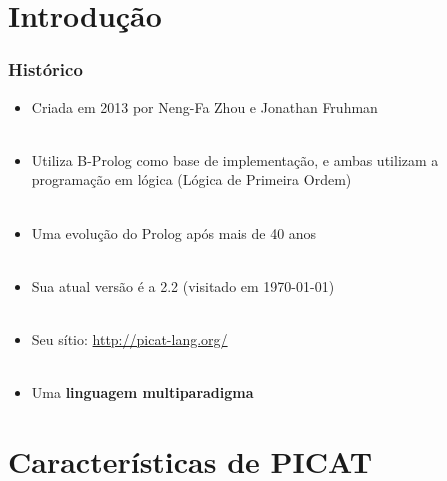 \documentclass[brazil]{beamer}
\begin{document}
\section{Introdução}
\begin{frame}

    \frametitle{Histórico}

    \begin{itemize}
      \item Criada em 2013 por Neng-Fa Zhou e Jonathan Fruhman \\~\\

      \item Utiliza B-Prolog como base de implementação, e ambas utilizam 
      a programação em lógica (Lógica de Primeira Ordem) \\~\\

      \item Uma evolução do Prolog após mais de 40 anos \\~\\

      \item Sua atual versão é a 2.2 (visitado em \today) \\~\\

      \item Seu sítio: \url{http://picat-lang.org/} \\~\\
      
      \item Uma \textbf{linguagem multiparadigma}
    \end{itemize}
\end{frame}
\section{Características de PICAT}
\end{document}
